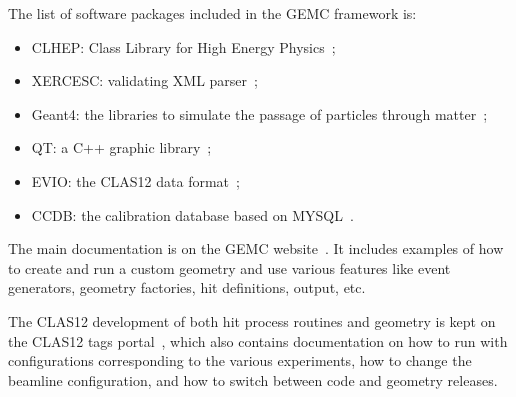The list of software packages included in the GEMC framework is:

\begin{itemize}
	\item CLHEP: Class Library for High Energy Physics~\cite{clhep};
	\item XERCESC: validating XML parser~\cite{xercesc};
	\item Geant4: the libraries to simulate the passage of particles through matter~\cite{geant4};
	\item QT: a C++ graphic library~\cite{qt};
	\item EVIO: the CLAS12 data format~\cite{evio};
	\item CCDB: the calibration database based on MYSQL~\cite{ccdb}.
\end{itemize}

The main documentation is on the GEMC website~\cite{GEMC}. It includes examples of how to create and run a custom
geometry and use various features like event generators, geometry factories, hit definitions, output, etc.

The CLAS12 development of both hit process routines and geometry is kept on the CLAS12 tags portal~\cite{clas12Tags},
which also contains documentation on how to run with configurations corresponding to the various experiments, how to
change the beamline configuration, and how to switch between code and geometry releases.





